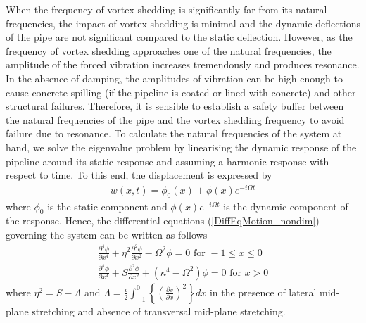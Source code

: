 \documentclass[3p,doublespacing,authoryear,11pt]{elsarticle} %
\begin{document}
When the frequency of vortex shedding is significantly far from its natural frequencies, the impact of vortex shedding is minimal and the dynamic deflections of the pipe are not significant compared to the static deflection. However, as the frequency of vortex shedding approaches one of the natural frequencies, the amplitude of the forced vibration increases tremendously and produces resonance. In the absence of damping, the amplitudes of vibration can be high enough to cause concrete spilling (if the pipeline is coated or lined with concrete) and other structural failures. Therefore, it is sensible to establish a safety buffer between the natural frequencies of the pipe and the vortex shedding frequency to avoid failure due to resonance. To calculate the natural frequencies of the system at hand, we solve the eigenvalue problem by linearising the dynamic response of the pipeline around its static response and assuming a harmonic response with respect to time. To this end, the displacement is expressed by 
 \begin{equation}\label{splittedDisplacement}
 \begin{array}{l }  
 w(x,t) = \phi_0(x) + \phi(x)e^{-i\Omega t}
  \end{array}  
\end{equation}
where $\phi_0$ is the static component and $\phi(x)e^{-i\Omega t}$ is the dynamic component of the response. Hence, the differential equations (\ref{DiffEqMotion_nondim}) governing the system can be written as follows
 \begin{equation}\label{DiffEqMotion_nondim_dynamics}
 \begin{array}{l } 
\displaystyle  \frac{\partial^4 \phi}{\partial x^4} + \eta^2 \frac{\partial^2 \phi}{\partial x^2}  - \Omega^2 \phi  =  0  \text{ for } -1 \le x \le 0 \\
\displaystyle  \frac{\partial^4 \phi}{\partial x^4} + S \frac{\partial^2 \phi}{\partial x^2}   + (\kappa^4- \Omega^2) \phi  = 0 \text{ for } x > 0
  \end{array}  
\end{equation}
where $\eta^2 = S-\Lambda$ and $\displaystyle \Lambda = \frac{\iota}{2} \int_{-1}^0  \left\{\left( \frac{\partial v}{\partial x}  \right)^2 \right\} dx $ in the presence of lateral mid-plane stretching and absence of transversal mid-plane stretching. 
\end{document}
